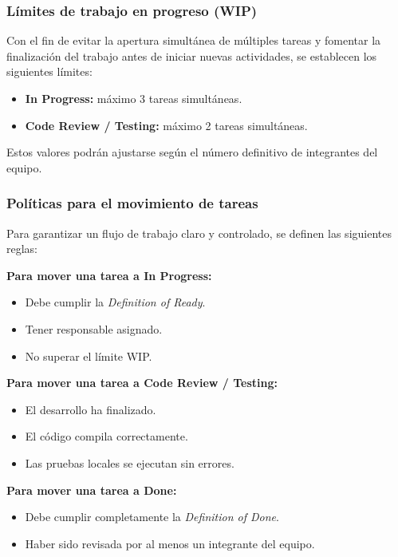 \documentclass[12pt]{article}
\begin{document}
\subsubsection{Límites de trabajo en progreso (WIP)}

Con el fin de evitar la apertura simultánea de múltiples tareas y fomentar la finalización del trabajo antes de iniciar nuevas actividades, se establecen los siguientes límites:

\begin{itemize}
    \item \textbf{In Progress:} máximo 3 tareas simultáneas.
    \item \textbf{Code Review / Testing:} máximo 2 tareas simultáneas.
\end{itemize}

Estos valores podrán ajustarse según el número definitivo de integrantes del equipo.

\subsubsection{Políticas para el movimiento de tareas}

Para garantizar un flujo de trabajo claro y controlado, se definen las siguientes reglas:

\textbf{Para mover una tarea a In Progress:}

\begin{itemize}
    \item Debe cumplir la \textit{Definition of Ready}.
    \item Tener responsable asignado.
    \item No superar el límite WIP.
\end{itemize}

\textbf{Para mover una tarea a Code Review / Testing:}

\begin{itemize}
    \item El desarrollo ha finalizado.
    \item El código compila correctamente.
    \item Las pruebas locales se ejecutan sin errores.
\end{itemize}

\textbf{Para mover una tarea a Done:}

\begin{itemize}
    \item Debe cumplir completamente la \textit{Definition of Done}.
    \item Haber sido revisada por al menos un integrante del equipo.
\end{itemize}
\end{document}
